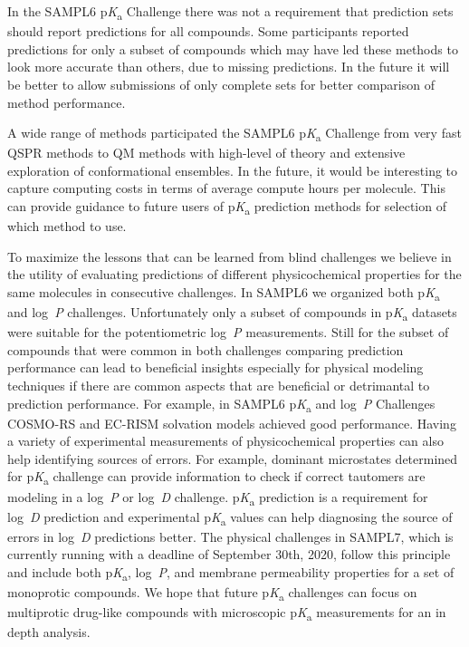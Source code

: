 \documentclass[9pt,lineno,final]{elife}
\newcommand{\pKa}{p\textit{K}\textsubscript{a}}
\newcommand{\logD}{log~\textit{D}}
\newcommand{\logP}{log~\textit{P}}
\begin{document}
In the SAMPL6 \pKa{} Challenge there was not a requirement that prediction sets should report predictions for all compounds. 
Some participants reported predictions for only a subset of compounds which may have led these methods to look more accurate than others, due to missing predictions.
In the future it will be better to allow submissions of only complete  sets for better comparison of method performance. 

A wide range of methods participated the SAMPL6 \pKa{} Challenge from very fast QSPR methods to QM methods with high-level of theory and extensive exploration of conformational ensembles. In the future, it would be interesting to capture computing costs in terms of average compute hours per molecule. This can provide guidance to future users of \pKa{} prediction methods for selection of which method to use.

To maximize the lessons that can be learned from blind challenges we believe in the utility of evaluating  predictions of different physicochemical properties for the same molecules in consecutive challenges. 
In SAMPL6 we organized both \pKa{} and \logP{} challenges. Unfortunately only a subset of compounds in \pKa{} datasets were suitable for the potentiometric \logP{} measurements. Still for the subset of compounds that were common in both challenges comparing prediction performance can lead to beneficial insights especially for physical modeling techniques if there are common aspects that are beneficial or detrimantal to prediction performance. For example, in SAMPL6 \pKa{} and \logP{} Challenges COSMO-RS and EC-RISM solvation models achieved good performance.
Having a variety of experimental measurements of physicochemical properties can also help identifying sources of errors. For example, dominant microstates determined for \pKa{} challenge can provide information to check if correct tautomers are modeling in a \logP{} or \logD{} challenge.
\pKa{} prediction is a requirement for \logD{} prediction and experimental \pKa{} values can help diagnosing the source of errors in \logD{} predictions better. 
The physical challenges in SAMPL7, which is currently running with a deadline of September 30th, 2020, follow this principle and include both \pKa{}, \logP{}, and membrane permeability properties for a set of monoprotic compounds. 
We hope that future \pKa{} challenges can focus on multiprotic drug-like compounds with microscopic \pKa{} measurements for an in depth analysis.



\end{document}

